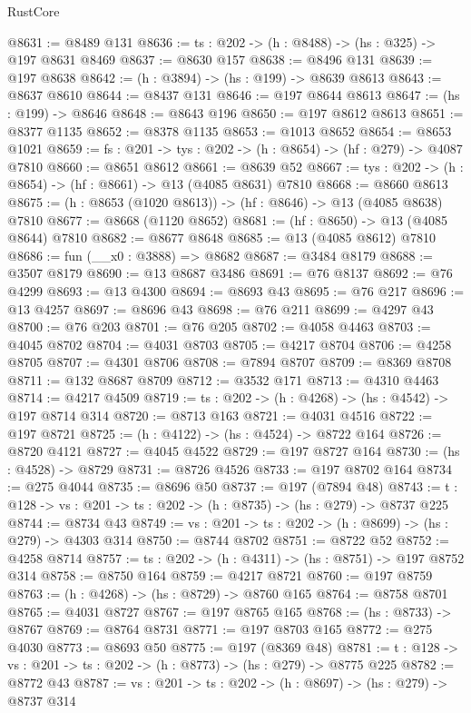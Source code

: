 \begin{lexlean}{RustCore}
\begin{coremodule}
@8631 := @8489 @131
@8636 := {ts : @202} -> (h : @8488) -> (hs : @325) -> @197 @8631 @8469
@8637 := @8630 @157
@8638 := @8496 @131
@8639 := @197 @8638
@8642 := (h : @3894) -> (hs : @199) -> @8639 @8613
@8643 := @8637 @8610
@8644 := @8437 @131
@8646 := @197 @8644 @8613
@8647 := (hs : @199) -> @8646
@8648 := @8643 @196
@8650 := @197 @8612 @8613
@8651 := @8377 @1135
@8652 := @8378 @1135
@8653 := @1013 @8652
@8654 := @8653 @1021
@8659 := {fs : @201} -> {tys : @202} -> (h : @8654) -> (hf : @279) -> @4087 @7810
@8660 := @8651 @8612
@8661 := @8639 @52
@8667 := {tys : @202} -> (h : @8654) -> (hf : @8661) -> @13 (@4085 @8631) @7810
@8668 := @8660 @8613
@8675 := (h : @8653 (@1020 @8613)) -> (hf : @8646) -> @13 (@4085 @8638) @7810
@8677 := @8668 (@1120 @8652)
@8681 := (hf : @8650) -> @13 (@4085 @8644) @7810
@8682 := @8677 @8648
@8685 := @13 (@4085 @8612) @7810
@8686 := fun (__x0 : @3888) => @8682
@8687 := @3484 @8179
@8688 := @3507 @8179
@8690 := @13 @8687 @3486
@8691 := @76 @8137
@8692 := @76 @4299
@8693 := @13 @4300
@8694 := @8693 @43
@8695 := @76 @217
@8696 := @13 @4257
@8697 := @8696 @43
@8698 := @76 @211
@8699 := @4297 @43
@8700 := @76 @203
@8701 := @76 @205
@8702 := @4058 @4463
@8703 := @4045 @8702
@8704 := @4031 @8703
@8705 := @4217 @8704
@8706 := @4258 @8705
@8707 := @4301 @8706
@8708 := @7894 @8707
@8709 := @8369 @8708
@8711 := @132 @8687 @8709
@8712 := @3532 @171
@8713 := @4310 @4463
@8714 := @4217 @4509
@8719 := {ts : @202} -> (h : @4268) -> (hs : @4542) -> @197 @8714 @314
@8720 := @8713 @163
@8721 := @4031 @4516
@8722 := @197 @8721
@8725 := (h : @4122) -> (hs : @4524) -> @8722 @164
@8726 := @8720 @4121
@8727 := @4045 @4522
@8729 := @197 @8727 @164
@8730 := (hs : @4528) -> @8729
@8731 := @8726 @4526
@8733 := @197 @8702 @164
@8734 := @275 @4044
@8735 := @8696 @50
@8737 := @197 (@7894 @48)
@8743 := {t : @128} -> {vs : @201} -> {ts : @202} -> (h : @8735) -> (hs : @279) -> @8737 @225
@8744 := @8734 @43
@8749 := {vs : @201} -> {ts : @202} -> (h : @8699) -> (hs : @279) -> @4303 @314
@8750 := @8744 @8702
@8751 := @8722 @52
@8752 := @4258 @8714
@8757 := {ts : @202} -> (h : @4311) -> (hs : @8751) -> @197 @8752 @314
@8758 := @8750 @164
@8759 := @4217 @8721
@8760 := @197 @8759
@8763 := (h : @4268) -> (hs : @8729) -> @8760 @165
@8764 := @8758 @8701
@8765 := @4031 @8727
@8767 := @197 @8765 @165
@8768 := (hs : @8733) -> @8767
@8769 := @8764 @8731
@8771 := @197 @8703 @165
@8772 := @275 @4030
@8773 := @8693 @50
@8775 := @197 (@8369 @48)
@8781 := {t : @128} -> {vs : @201} -> {ts : @202} -> (h : @8773) -> (hs : @279) -> @8775 @225
@8782 := @8772 @43
@8787 := {vs : @201} -> {ts : @202} -> (h : @8697) -> (hs : @279) -> @8737 @314

\end{coremodule}
\end{lexlean}
